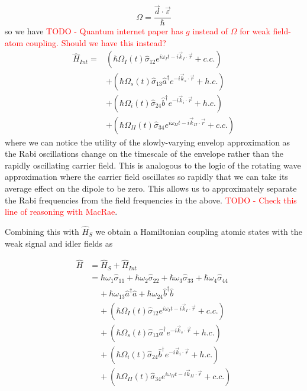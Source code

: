 \documentclass[aps,pra,showpacs,amsmath,amssymb,nofootinbib,longbibliography,superscriptaddress
]{revtex4-1}
\theoremstyle{definition}
\theoremstyle{remark}
\newcommand{\0}{\hat{0}}
\begin{document}
\begin{equation}
    \Omega = \frac{\vec{d} \cdot \vec{\varepsilon}}{\hbar}
\end{equation}
so we have \textcolor{red}{TODO - Quantum internet paper has $g$ instead of $\Omega$ for weak field-atom coupling. Should we have this instead?}
\begin{align}
    \hat{H}_{Int} = &\left(\hbar \Omega_{I}(t) \hat{\sigma}_{12} e^{i \omega_I t - i \vec{k}_I \cdot \vec{r}} + c.c.\right)\nonumber \\
    &+ \left(\hbar \Omega_{s}(t) \hat{\sigma}_{13} \hat{a}^{\dagger} e^{-i \vec{k}_{s} \cdot \vec{r}} + h.c.\right)\nonumber \\
    &+ \left(\hbar \Omega_{i}(t) \hat{\sigma}_{24} \hat{b}^{\dagger} e^{-i \vec{k}_{i} \cdot \vec{r}} + h.c.\right)\nonumber \\
    &+ \left(\hbar \Omega_{II}(t) \hat{\sigma}_{34} e^{i \omega_{II} t - i \vec{k}_{II} \cdot \vec{r}} + c.c.\right)
\end{align}
where we can notice the utility of the slowly-varying envelop approximation as the Rabi oscillations change on the timescale of the envelope rather than the rapidly oscillating carrier field. This is analogous to the logic of the rotating wave approximation where the carrier field oscillates so rapidly that we can take its average effect on the dipole to be zero. This allows us to approximately separate the Rabi frequencies from the field frequencies in the above. \textcolor{red}{TODO - Check this line of reasoning with MacRae}.

Combining this with $\hat{H}_S$ we obtain a Hamiltonian coupling atomic states with the weak signal and idler fields as

\begin{align}
    \hat{H} &= \hat{H}_S + \hat{H}_{Int}\\
    &= \hbar \omega_1 \hat{\sigma}_{11} + \hbar \omega_2 \hat{\sigma}_{22} + \hbar \omega_3 \hat{\sigma}_{33} + \hbar \omega_4 \hat{\sigma}_{44}\nonumber \\
    &\;\;\;\;+ \hbar \omega_{13} \hat{a}^{\dagger} \hat{a} + \hbar \omega_{24} \hat{b}^{\dagger} \hat{b}\nonumber \\
    &\;\;\;\;+ \left(\hbar \Omega_{I}(t) \hat{\sigma}_{12} e^{i \omega_I t - i \vec{k}_I \cdot \vec{r}} + c.c.\right)\nonumber \\
    &\;\;\;\;+ \left(\hbar \Omega_{s}(t) \hat{\sigma}_{13} \hat{a}^{\dagger} e^{-i \vec{k}_{s} \cdot \vec{r}} + h.c.\right)\nonumber \\
    &\;\;\;\;+ \left(\hbar \Omega_{i}(t) \hat{\sigma}_{24} \hat{b}^{\dagger} e^{-i \vec{k}_{i} \cdot \vec{r}} + h.c.\right)\nonumber \\
    &\;\;\;\;+ \left(\hbar \Omega_{II}(t) \hat{\sigma}_{34} e^{i \omega_{II} t - i \vec{k}_{II} \cdot \vec{r}} + c.c.\right)
\end{align}
\end{document}
